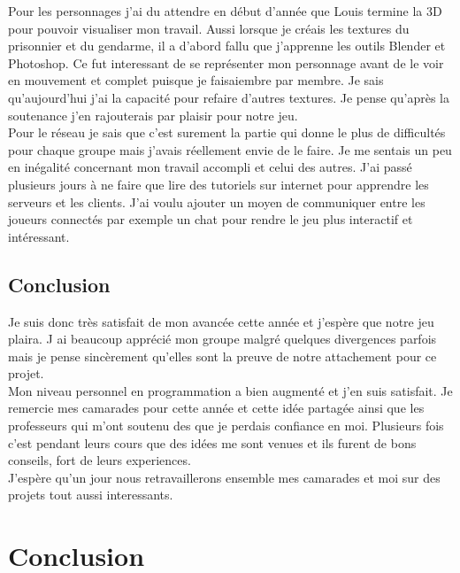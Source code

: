 \documentclass[12pt]{article}
\begin{document}
Pour les personnages j’ai du attendre en début d’année que Louis termine la 3D pour pouvoir visualiser mon travail. Aussi lorsque je créais les textures du prisonnier et du gendarme, il a d’abord fallu que j’apprenne  les outils Blender et Photoshop. Ce fut interessant de se représenter mon personnage avant de le voir en mouvement et complet puisque je faisaiembre par membre.  Je sais qu’aujourd’hui j’ai la capacité pour refaire d’autres textures. Je pense qu’après la soutenance j’en rajouterais par plaisir pour notre jeu.\\

Pour le réseau je sais que c’est surement la partie qui donne le plus de difficultés pour chaque groupe mais j’avais réellement envie de le faire. Je me sentais un peu en inégalité concernant mon travail accompli et celui des autres. J’ai passé plusieurs jours à ne faire que lire des tutoriels sur internet pour apprendre les serveurs et les clients. J’ai voulu ajouter un moyen de communiquer entre les joueurs connectés par exemple un chat pour rendre le jeu plus interactif et intéressant.\\

\newpage
\subsection{Conclusion}

Je suis donc très satisfait de mon avancée cette année et j'espère que notre jeu plaira. J ai beaucoup apprécié mon groupe malgré quelques divergences  parfois mais je pense sincèrement qu'elles sont la preuve de notre attachement pour ce projet.\\

Mon niveau personnel en programmation a bien augmenté et j'en suis satisfait. Je remercie mes camarades pour cette année et cette idée partagée ainsi que les professeurs qui m'ont soutenu des que je perdais confiance en moi. Plusieurs fois c'est pendant leurs cours que des idées me sont venues et ils furent de bons conseils, fort de leurs experiences.\\

 J'espère qu'un jour nous retravaillerons ensemble  mes camarades et moi sur des  projets tout aussi interessants.\\

\newpage
\thispagestyle{empty}
\pagestyle{fancyplain} \chead{} 
\listoffigures

\section{Conclusion}
\newpage
\setcounter{page}{1} 
\end{document}
